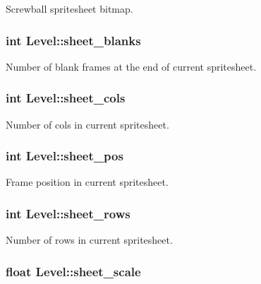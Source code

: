\-Screwball spritesheet bitmap. \hypertarget{structLevel_aebaaba311e5d4842fdbd8c50edd40808}{
\subsubsection[{sheet\-\_\-blanks}]{\setlength{\rightskip}{0pt plus 5cm}int {\bf \-Level\-::sheet\-\_\-blanks}}}\label{structLevel_aebaaba311e5d4842fdbd8c50edd40808}
\-Number of blank frames at the end of current spritesheet. \hypertarget{structLevel_a8a5c443169a4ff15f330a65473eedb1b}{
\subsubsection[{sheet\-\_\-cols}]{\setlength{\rightskip}{0pt plus 5cm}int {\bf \-Level\-::sheet\-\_\-cols}}}\label{structLevel_a8a5c443169a4ff15f330a65473eedb1b}
\-Number of cols in current spritesheet. \hypertarget{structLevel_a21c699af201ffe60ccd1319b3f540947}{
\subsubsection[{sheet\-\_\-pos}]{\setlength{\rightskip}{0pt plus 5cm}int {\bf \-Level\-::sheet\-\_\-pos}}}\label{structLevel_a21c699af201ffe60ccd1319b3f540947}
\-Frame position in current spritesheet. \hypertarget{structLevel_a6d608b79c9b4dd8a5efc0c7e5fb482b0}{
\subsubsection[{sheet\-\_\-rows}]{\setlength{\rightskip}{0pt plus 5cm}int {\bf \-Level\-::sheet\-\_\-rows}}}\label{structLevel_a6d608b79c9b4dd8a5efc0c7e5fb482b0}
\-Number of rows in current spritesheet. \hypertarget{structLevel_a267a140bd3de1fc3f23a88623de425ed}{
\subsubsection[{sheet\-\_\-scale}]{\setlength{\rightskip}{0pt plus 5cm}float {\bf \-Level\-::sheet\-\_\-scale}}}\label{structLevel_a267a140bd3de1fc3f23a88623de425ed}
